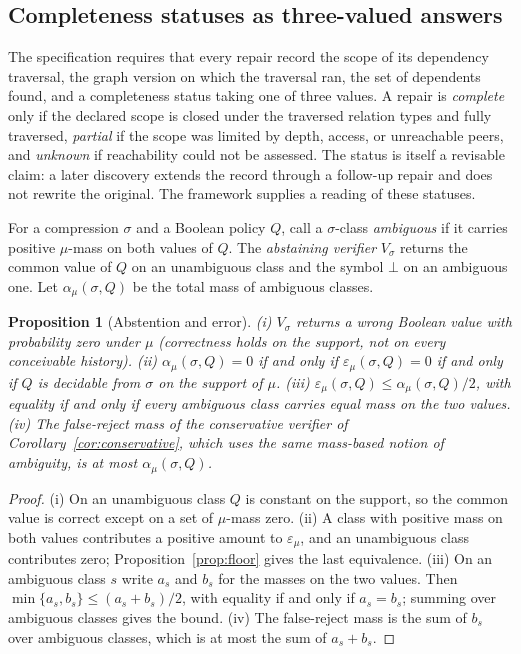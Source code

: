 \documentclass[11pt]{article}
\newtheorem{proposition}{Proposition}
\theoremstyle{definition}
\theoremstyle{remark}
\begin{document}
\subsection{Completeness statuses as three-valued answers}

The specification requires that every repair record the scope of its dependency traversal, the graph version on which the traversal ran, the set of dependents found, and a completeness status taking one of three values. A repair is \emph{complete} only if the declared scope is closed under the traversed relation types and fully traversed, \emph{partial} if the scope was limited by depth, access, or unreachable peers, and \emph{unknown} if reachability could not be assessed. The status is itself a revisable claim: a later discovery extends the record through a follow-up repair and does not rewrite the original. The framework supplies a reading of these statuses.

For a compression $\sigma$ and a Boolean policy $Q$, call a $\sigma$-class \emph{ambiguous} if it carries positive $\mu$-mass on both values of $Q$. The \emph{abstaining verifier} $V_\sigma$ returns the common value of $Q$ on an unambiguous class and the symbol $\bot$ on an ambiguous one. Let $\alpha_\mu(\sigma,Q)$ be the total mass of ambiguous classes.

\begin{proposition}[Abstention and error]\label{prop:abstain}
(i) $V_\sigma$ returns a wrong Boolean value with probability zero under $\mu$ (correctness holds on the support, not on every conceivable history). (ii) $\alpha_\mu(\sigma,Q)=0$ if and only if $\varepsilon_\mu(\sigma,Q)=0$ if and only if $Q$ is decidable from $\sigma$ on the support of $\mu$. (iii) $\varepsilon_\mu(\sigma,Q)\le\alpha_\mu(\sigma,Q)/2$, with equality if and only if every ambiguous class carries equal mass on the two values. (iv) The false-reject mass of the conservative verifier of Corollary~\ref{cor:conservative}, which uses the same mass-based notion of ambiguity, is at most $\alpha_\mu(\sigma,Q)$.
\end{proposition}

\begin{proof}
(i) On an unambiguous class $Q$ is constant on the support, so the common value is correct except on a set of $\mu$-mass zero. (ii) A class with positive mass on both values contributes a positive amount to $\varepsilon_\mu$, and an unambiguous class contributes zero; Proposition~\ref{prop:floor} gives the last equivalence. (iii) On an ambiguous class $s$ write $a_s$ and $b_s$ for the masses on the two values. Then $\min\{a_s,b_s\}\le(a_s+b_s)/2$, with equality if and only if $a_s=b_s$; summing over ambiguous classes gives the bound. (iv) The false-reject mass is the sum of $b_s$ over ambiguous classes, which is at most the sum of $a_s+b_s$.
\end{proof}
\end{document}
